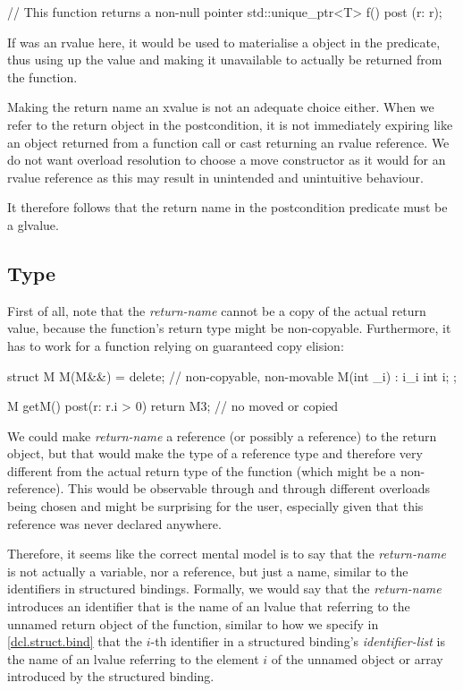 \begin{codeblock}
// This function returns a non-null pointer
std::unique_ptr<T> f()
  post (r: r);
\end{codeblock}

If  was an rvalue here, it would be used to materialise a  object in the predicate, thus using up the value and making it unavailable to actually be returned from the function.

Making the return name an xvalue is not an adequate choice either. When we refer to the return object in the postcondition, it is not immediately expiring like an object returned from a function call or cast returning an rvalue reference.  We do not want overload resolution to choose a move constructor as it would for an rvalue reference as this may result in unintended and unintuitive behaviour.

It therefore follows that the return name in the postcondition predicate must be a glvalue.

\subsection{Type}

First of all, note that the \emph{return-name} cannot be a copy of the actual return value, because the function's return type might be non-copyable. Furthermore, it has to work for a function relying on guaranteed copy elision:

\begin{codeblock}
struct M {
  M(M&&) = delete; // non-copyable, non-movable
  M(int _i) : i{_i}  {}
  int i;
};

M getM()
  post(r: r.i > 0)
{
  return M{3}; // no  moved or copied
}
\end{codeblock}

We could make \emph{return-name} a reference (or possibly a  reference) to the return object, but that would make the type of  a reference type and therefore very different from the actual return type of the function (which might be a non-reference). This would be observable through  and through different overloads being chosen and might be surprising for the user, especially given that this reference was never declared anywhere.

Therefore, it seems like the correct mental model is to say that the \emph{return-name} is not actually a variable, nor a reference, but just a name, similar to the identifiers in structured bindings. Formally, we would say that the \emph{return-name} introduces an identifier that is the name of an lvalue that referring to the unnamed return object of the function, similar to how we specify in \href{https://eel.is/c++draft/dcl.struct.bind}{[dcl.struct.bind]} that the $i$-th identifier in a structured binding's \emph{identifier-list} is the name of an lvalue referring to the element $i$ of the unnamed object or array introduced by the structured binding.

